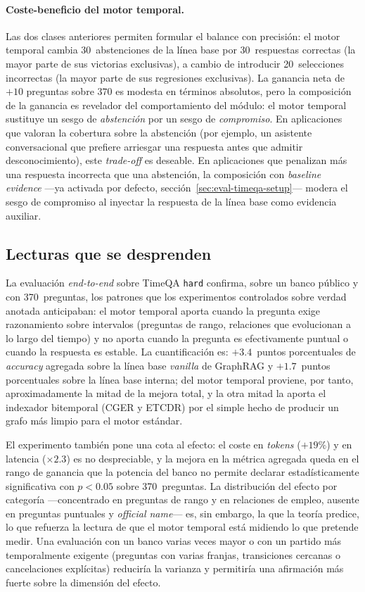 \paragraph{Coste-beneficio del motor temporal.} Las dos clases anteriores permiten formular el balance con precisión: el motor temporal cambia 30~abstenciones de la línea base por 30~respuestas correctas (la mayor parte de sus victorias exclusivas), a cambio de introducir 20~selecciones incorrectas (la mayor parte de sus regresiones exclusivas). La ganancia neta de $+10$ preguntas sobre $370$ es modesta en términos absolutos, pero la composición de la ganancia es revelador del comportamiento del módulo: el motor temporal sustituye un sesgo de \emph{abstención} por un sesgo de \emph{compromiso}. En aplicaciones que valoran la cobertura sobre la abstención (por ejemplo, un asistente conversacional que prefiere arriesgar una respuesta antes que admitir desconocimiento), este \emph{trade-off} es deseable. En aplicaciones que penalizan más una respuesta incorrecta que una abstención, la composición con \emph{baseline evidence} ---ya activada por defecto, sección~\ref{sec:eval-timeqa-setup}--- modera el sesgo de compromiso al inyectar la respuesta de la línea base como evidencia auxiliar.

\subsection{Lecturas que se desprenden}\label{sec:eval-timeqa-readings}

La evaluación \emph{end-to-end} sobre TimeQA \texttt{hard} confirma, sobre un banco público y con 370~preguntas, los patrones que los experimentos controlados sobre verdad anotada anticipaban: el motor temporal aporta cuando la pregunta exige razonamiento sobre intervalos (preguntas de rango, relaciones que evolucionan a lo largo del tiempo) y no aporta cuando la pregunta es efectivamente puntual o cuando la respuesta es estable. La cuantificación es: $+3.4$~puntos porcentuales de \emph{accuracy} agregada sobre la línea base \emph{vanilla} de GraphRAG y $+1.7$~puntos porcentuales sobre la línea base interna; del motor temporal proviene, por tanto, aproximadamente la mitad de la mejora total, y la otra mitad la aporta el indexador bitemporal (CGER y ETCDR) por el simple hecho de producir un grafo más limpio para el motor estándar.

El experimento también pone una cota al efecto: el coste en \emph{tokens} ($+19\%$) y en latencia ($\times 2.3$) es no despreciable, y la mejora en la métrica agregada queda en el rango de ganancia que la potencia del banco no permite declarar estadísticamente significativa con $p<0.05$ sobre 370~preguntas. La distribución del efecto por categoría ---concentrado en preguntas de rango y en relaciones de empleo, ausente en preguntas puntuales y \emph{official name}--- es, sin embargo, la que la teoría predice, lo que refuerza la lectura de que el motor temporal está midiendo lo que pretende medir. Una evaluación con un banco varias veces mayor o con un partido más temporalmente exigente (preguntas con varias franjas, transiciones cercanas o cancelaciones explícitas) reduciría la varianza y permitiría una afirmación más fuerte sobre la dimensión del efecto.

